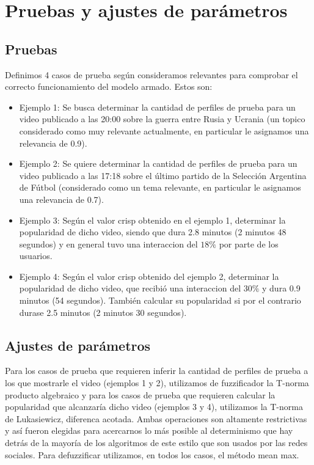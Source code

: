 \documentclass{article}
\begin{document}
\section{Pruebas y ajustes de parámetros}

\subsection{Pruebas}

Definimos 4 casos de prueba según consideramos relevantes para comprobar el correcto funcionamiento del modelo armado. Estos son:

\begin{itemize}
	\item Ejemplo 1: Se busca determinar la cantidad de perfiles de prueba para un video publicado a las 20:00 sobre la guerra entre Rusia y Ucrania (un topico considerado como muy relevante actualmente, en particular le asignamos una relevancia de 0.9).
 	\item Ejemplo 2: Se quiere determinar la cantidad de perfiles de prueba para un video publicado a las 17:18 sobre el último partido de la Selección Argentina de Fútbol (considerado como un tema relevante, en particular le asignamos una relevancia de 0.7).
	\item Ejemplo 3: Según el valor crisp obtenido en el ejemplo 1, determinar la popularidad de dicho video, siendo que dura 2.8 minutos (2 minutos 48 segundos) y en general tuvo una interaccion del $18\%$ por parte de los usuarios.
	\item Ejemplo 4: Según el valor crisp obtenido del ejemplo 2, determinar la popularidad de dicho video, que recibió una interaccion del $30\%$ y dura 0.9 minutos (54 segundos). También calcular su popularidad si por el contrario durase 2.5 minutos (2 minutos 30 segundos).
\end{itemize}

\subsection{Ajustes de parámetros}

Para los casos de prueba que requieren inferir la cantidad de perfiles de prueba a los que mostrarle el video (ejemplos 1 y 2), utilizamos de fuzzificador la T-norma producto algebraico y para los casos de prueba que requieren calcular la popularidad que alcanzaría dicho video (ejemplos 3 y 4), utilizamos la T-norma de Lukasiewicz, diferenca acotada. 
Ambas operaciones son altamente restrictivas y así fueron elegidas para acercarnos lo más posible al determinismo que hay detrás de la mayoría de los algoritmos de este estilo que son usados por las redes sociales. 
Para defuzzificar utilizamos, en todos los casos, el método mean max.
\end{document}
